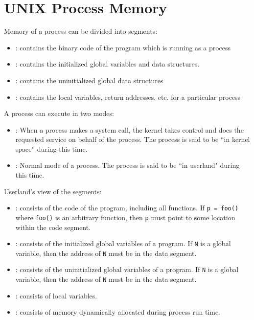 \chapter*{UNIX Process Memory}

\par Memory of a process can be divided into segments:
  \begin{itemize}
    \item {}: contains the binary code of the program which is running as a process
    \item {}: contains the initialized global variables and data structures.
    \item {}:  contains the uninitialized global data structures
    \item {}: contains the local variables, return addresses, etc. for a particular process
  \end{itemize}

\par A process can execute in two modes:
  \begin{itemize}
    \item {}: When a process makes a system call, the kernel takes control and does the requested service on behalf of the process. The process is said to be ``in kernel space” during this time.
    \item {}: Normal mode of a process. The process is said to be ``in userland" during this time.
  \end{itemize}

\par Userland’s view of the segments:
\begin{itemize}
  \item {}: consists of the code of the program, including all functions. If \lstinline{p = foo()} where \lstinline{foo()} is an arbitrary function, then \lstinline{p} must point to some location within the code segment.
  \item {}: consists of the initialized global variables of a program. If \lstinline{N} is a global variable, then the address of \lstinline{N} must be in the data segment.
  \item {}: consists of the uninitialized global variables of a program. If \lstinline{N} is a global variable, then the address of \lstinline{N} must be in the data segment.
  \item {}: consists of local variables.
  \item {}: consists of memory dynamically allocated during process run time.
\end{itemize}


